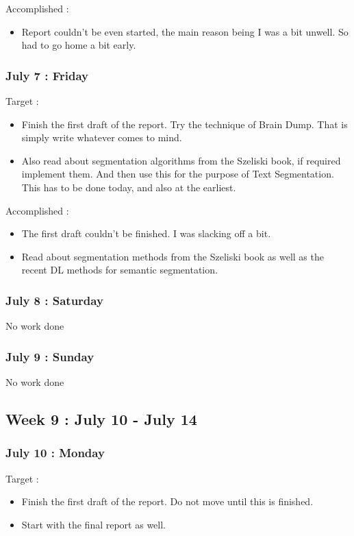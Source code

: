 \documentclass{article}
\begin{document}
Accomplished :
\begin{itemize}
\item Report couldn't be even started, the main reason being I was a bit unwell. So had to go home a bit early.
\end{itemize}

\subsubsection{July 7 : Friday}
Target :
\begin{itemize}
\item Finish the first draft of the report. Try the technique of Brain Dump. That is simply write whatever comes to mind.
\item Also read about segmentation algorithms from the Szeliski book, if required implement them. And then use this for the purpose of Text Segmentation. This has to be done today, and also at the earliest.
\end{itemize}

Accomplished :
\begin{itemize}
\item The first draft couldn't be finished. I was slacking off a bit.
\item Read about segmentation methods from the Szeliski book as well as the recent DL methods for semantic segmentation.
\end{itemize}

\subsubsection{July 8 : Saturday}
No work done

\subsubsection{July 9 : Sunday}
No work done

\subsection{Week 9 : July 10 - July 14}
\subsubsection{July 10 : Monday}
Target :
\begin{itemize}
\item Finish the first draft of the report. Do not move until this is finished.
\item Start with the final report as well.
\end{itemize}
\end{document}
